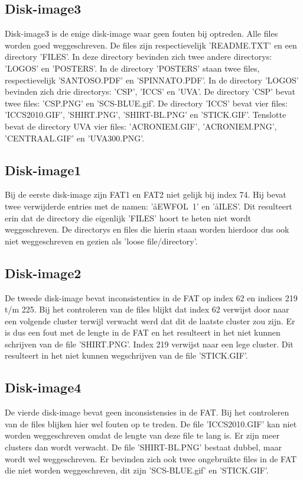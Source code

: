 \documentclass[11pt]{article}
\begin{document}
	\subsection{Disk-image3}\label{sec:disk3}
	Disk-image3 is de enige disk-image waar geen fouten bij optreden. Alle files worden goed weggeschreven. De files zijn respectievelijk 'README.TXT' en een directory 'FILES'. In deze directory bevinden zich twee andere directorys: 'LOGOS' en 'POSTERS'. In de directory 'POSTERS' staan twee files, respectievelijk 'SANTOSO.PDF' en 'SPINNATO.PDF'. In de directory 'LOGOS' bevinden zich drie directorys: 'CSP', 'ICCS' en 'UVA'. De directory 'CSP' bevat twee files: 'CSP.PNG' en 'SCS-BLUE.gif'. De directory 'ICCS' bevat vier files: 'ICCS2010.GIF', 'SHIRT.PNG', 'SHIRT-BL.PNG' en 'STICK.GIF'. Tenslotte bevat de directory UVA vier files: 'ACRONIEM.GIF', 'ACRONIEM.PNG', 'CENTRAAL.GIF' en 'UVA300.PNG'.

	\subsection{Disk-image1}\label{sec:disk1}
	Bij de eerste disk-image zijn FAT1 en FAT2 niet gelijk bij index 74. Hij bevat twee verwijderde entries met de namen: 'åEWFOL~1' en 'åILES'. Dit resulteert erin dat de directory die eigenlijk 'FILES' hoort te heten niet wordt weggeschreven. De directorys en files die hierin staan worden hierdoor dus ook niet weggeschreven en gezien als 'loose file/directory'.

	\subsection{Disk-image2}\label{sec:disk2}
	De tweede disk-image bevat inconsistenties in de FAT op index 62 en indices 219 t/m 225. Bij het controleren van de files blijkt dat index 62 verwijst door naar een volgende cluster terwijl verwacht werd dat dit de laatste cluster zou zijn. Er is dus een fout met de lengte in de FAT en het resulteert in het niet kunnen schrijven van de file 'SHIRT.PNG'. Index 219 verwijst naar een lege cluster. Dit resulteert in het niet kunnen wegschrijven van de file 'STICK.GIF'.

	\subsection{Disk-image4}\label{sec:disk4}
	De vierde disk-image bevat geen inconsistensies in de FAT. Bij het controleren van de files blijken hier wel fouten op te treden. De file 'ICCS2010.GIF' kan niet worden weggeschreven omdat de lengte van deze file te lang is. Er zijn meer clusters dan wordt verwacht. De file 'SHIRT-BL.PNG' bestaat dubbel, maar wordt wel weggeschreven. Er bevinden zich ook twee ongebruikte files in de FAT die niet worden weggeschreven, dit zijn 'SCS-BLUE.gif' en 'STICK.GIF'. 
\end{document}

